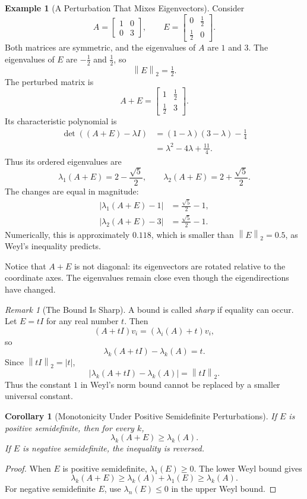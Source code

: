 \documentclass[14pt,letterpaper]{article}
\theoremstyle{plain}
\newtheorem{corollary}[theorem]{Corollary}
\theoremstyle{definition}
\newtheorem{example}[theorem]{Example}
\theoremstyle{remark}
\newtheorem{remark}[theorem]{Remark}
\newcommand{\norm}[1]{\left\lVert #1 \right\rVert}
\newcommand{\abs}[1]{\left| #1 \right|}
\begin{document}
\begin{example}[A Perturbation That Mixes Eigenvectors]
\label{ex:weyl_two_by_two}
Consider
\[
A=\begin{bmatrix}1&0\\0&3\end{bmatrix},
\qquad
E=\begin{bmatrix}0&\tfrac12\\
                  \tfrac12&0\end{bmatrix}.
\]
Both matrices are symmetric, and the eigenvalues
of $A$ are $1$ and $3$. The eigenvalues of $E$
are $-\tfrac12$ and $\tfrac12$, so
\[
\boxed{\norm{E}_2=\tfrac12.}
\]
The perturbed matrix is
\[
A+E=\begin{bmatrix}1&\tfrac12\\
                   \tfrac12&3\end{bmatrix}.
\]
Its characteristic polynomial is
\[
\begin{aligned}
\det((A+E)-\lambda I)
&=(1-\lambda)(3-\lambda)-\tfrac14\\
&=\lambda^2-4\lambda+\tfrac{11}{4}.
\end{aligned}
\]
Thus its ordered eigenvalues are
\[
\lambda_1(A+E)=2-\frac{\sqrt5}{2},
\qquad
\lambda_2(A+E)=2+\frac{\sqrt5}{2}.
\]
The changes are equal in magnitude:
\[
\begin{aligned}
\abs{\lambda_1(A+E)-1}
&=\frac{\sqrt5}{2}-1,\\
\abs{\lambda_2(A+E)-3}
&=\frac{\sqrt5}{2}-1.
\end{aligned}
\]
Numerically, this is approximately $0.118$, which
is smaller than $\norm{E}_2=0.5$, as Weyl's
inequality predicts.

Notice that $A+E$ is not diagonal: its eigenvectors
are rotated relative to the coordinate axes.
The eigenvalues remain close even though the
eigendirections have changed.
\end{example}

\begin{remark}[The Bound Is Sharp]
\label{rem:weyl_sharp}
A bound is called \emph{sharp} if equality can occur.
Let $E=tI$ for any real number $t$. Then
\[
(A+tI)v_i=(\lambda_i(A)+t)v_i,
\]
so
\[
\lambda_k(A+tI)-\lambda_k(A)=t.
\]
Since $\norm{tI}_2=\abs{t}$,
\[
\boxed{
\abs{\lambda_k(A+tI)-\lambda_k(A)}
=\norm{tI}_2.
}
\]
Thus the constant $1$ in Weyl's norm bound
cannot be replaced by a smaller universal constant.
\end{remark}

\begin{corollary}[Monotonicity Under Positive Semidefinite Perturbations]
\label{cor:weyl_psd}
If $E$ is positive semidefinite, then for every $k$,
\[
\boxed{\lambda_k(A+E)\geq\lambda_k(A).}
\]
If $E$ is negative semidefinite, the inequality
is reversed.
\end{corollary}
\begin{proof}
When $E$ is positive semidefinite,
$\lambda_1(E)\geq0$. The lower Weyl bound gives
\[
\lambda_k(A+E)\geq\lambda_k(A)+\lambda_1(E)
\geq\lambda_k(A).
\]
For negative semidefinite $E$, use
$\lambda_n(E)\leq0$ in the upper Weyl bound.
\end{proof}
\end{document}
